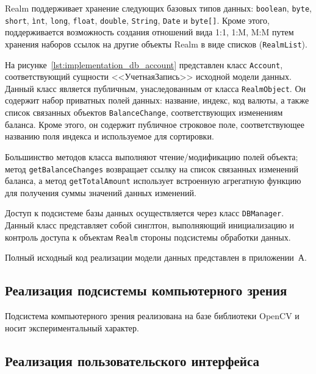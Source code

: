 Realm поддерживает хранение следующих базовых типов данных:
\texttt{boolean}, \texttt{byte}, \texttt{short}, \texttt{ìnt},
\texttt{long}, \texttt{float}, \texttt{double}, \texttt{String},
\texttt{Date} и \texttt{byte[]}.
Кроме этого, поддерживается возможность создания отношений вида
1:1, 1:M, M:M путем хранения наборов ссылок на другие объекты Realm
в виде списков (\texttt{RealmList}).

На рисунке~\ref{lst:implementation_db_account} представлен класс
\texttt{Account}, соответствующий сущности <<УчетнаяЗапись>> исходной
модели данных.
Данный класс является публичным, унаследованным от класса \texttt{RealmObject}.
Он содержит набор приватных полей данных: название, индекс, код валюты,
а также список связанных объектов \texttt{BalanceChange},
соответствующих изменениям баланса.
Кроме этого, он содержит публичное строковое поле, соответствующее
названию поля индекса и используемое для сортировки.



Большинство методов класса выполняют чтение/модификацию
полей объекта; метод \texttt{getBalanceChanges} возвращает ссылку на
список связанных изменений баланса,
а метод \texttt{getTotalAmount} использует встроенную
агрегатную функцию для получения суммы значений данных изменений.

Доступ к подсистеме базы данных осуществляется через класс
\texttt{DBManager}. Данный класс представляет собой синглтон,
выполняющий инициализацию и контроль доступа к объектам \texttt{Realm}
стороны подсистемы обработки данных.

Полный исходный код реализации модели данных представлен в приложении~А.

\subsection{Реализация подсистемы компьютерного зрения}
\label{subsec:implementation_cv}

Подсистема компьютерного зрения реализована на базе библиотеки
OpenCV и носит экспериментальный характер.

\subsection{Реализация пользовательского интерфейса}
\label{subsec:implementation_ui}

